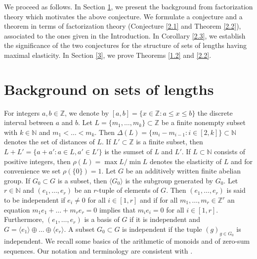 \documentclass[a4paper,10pt]{amsart}
\theoremstyle{plain}
\theoremstyle{definition}
\newcommand{\N}{\mathbb N}
\newcommand{\Z}{\mathbb Z}
\numberwithin{equation}{section}
\begin{document}
We proceed as follows. In Section \ref{2}, we present the background from factorization theory which motivates the above conjecture. We formulate a conjecture and a theorem in terms of factorization theory (Conjecture \ref{2.1} and Theorem \ref{2.2}), associated to the ones given in the Introduction. In Corollary \ref{2.3}, we establish the significance of the two conjectures for the structure of sets of lengths having maximal elasticity. In Section \ref{3}, we prove Theorems \ref{1.2} and \ref{2.2}.

\section{Background on sets of lengths}\label{2}
\smallskip

For integers $a, b \in \Z$, we denote by $[a, b] = \{ x \in \Z \colon a \le x \le b\}$ the discrete interval between $a$ and $b$. Let $L = \{m_1, \ldots, m_k\} \subset \Z$ be a finite nonempty subset with $k \in \N$ and $m_1 < \ldots < m_k$. Then $\Delta (L) = \{m_i - m_{i-1} \colon i \in [2,k] \} \subset \N$ denotes the set of distances of $L$. If $L' \subset \Z$ is a finite subset, then $L+L' = \{a + a' \colon a \in L, a' \in L'\}$ is the sumset of $L$ and $L'$. If $L \subset \N$ consists of positive integers, then $\rho (L) = \max L / \min L$ denotes the elasticity of $L$ and for convenience we set $\rho ( \{0\}) = 1$. Let $G$ be an additively written finite abelian group. If $G_0 \subset G$ is a subset, then $\langle G_0 \rangle$ is the subgroup generated by $G_0$. Let $r \in \N$ and $(e_1, \ldots, e_r)$ be an $r$-tuple of elements of $G$. Then $(e_1, \ldots, e_r)$ is said to be independent if $e_i \ne 0$ for all $i \in [1,r]$ and if for all $m_1, \ldots, m_r \in \Z^r$ an equation $m_1e_1 + \ldots + m_re_r = 0$ implies that $m_ie_i=0$ for all $i \in [1,r]$. Furthermore, $(e_1, \ldots, e_r)$ is a basis of $G$ if it is independent and $G = \langle e_1 \rangle \oplus \ldots \oplus \langle e_r \rangle$. A subset $G_0 \subset G$ is independent if the tuple $(g)_{g \in G_0}$ is independent.
We recall some basics of the arithmetic of monoids and of zero-sum sequences. Our notation and terminology are consistent with \cite{Ge-Ru09, Gr13a}.
\end{document}
